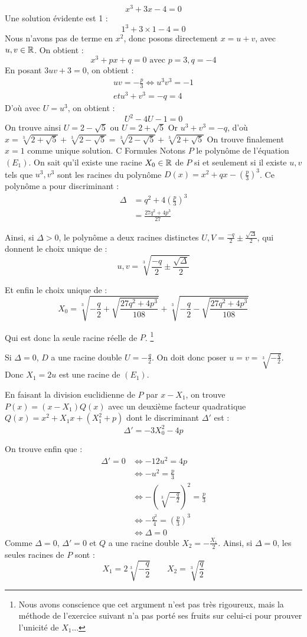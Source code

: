 \documentclass[]{../templates/homework}
\begin{document}
	$$ x^3 + 3x - 4 = 0$$
	\question Une solution évidente est 1 : $$1^3 + 3\times1 - 4 = 0$$
	\question Nous n'avons pas de terme en $x^2$, donc posons directement $x = u+v$, avec $u, v \in \mathbb R$.
	On obtient : $$x^3 + px + q = 0 \text{ avec } p=3, q=-4$$
	En posant $3uv + 3 = 0$, on obtient : 
\begin{align*}
 uv = -\frac{p}{3} \iff u^3v^3 = -1 \\
et u^3 + v^3 = -q = 4
\end{align*}
	D'où avec $U = u^3$, on obtient : $$U^2 -4U -1 =0$$
	On trouve ainsi $U = 2 - \sqrt{5}$ ou $U = 2 + \sqrt{5}$
	Or $u^3 + v^3 = -q$, d'où $x = \sqrt[3]{2+\sqrt{5}} + \sqrt[3]{2-\sqrt{5}} = \sqrt[3]{2-\sqrt{5}} + \sqrt[3]{2+\sqrt{5}}$
On trouve finalement $x=1$ comme unique solution.
	\partie C {Formules}
	 Notons $P$ le polynôme de l'équation $(E_1)$. On sait qu'il existe une racine $X_0 \in \mathbb R$ de $P$ si et seulement si il existe $u,v$ tels que $u^3,v^3$ sont les racines du polynôme $D(x) = x^2 + qx - \left(\frac p 3\right)^3$.
	Ce polynôme a pour discriminant :
	\begin{align*}
		\Delta &= q^2 + 4\left(\frac p 3\right)^3 \\
		&=  \frac {27q^2 + 4p^3}{27}
	\end{align*}
	
	
	Ainsi, si $\Delta > 0$, le polynôme a deux racines distinctes $U,V = \frac {-q}{2} \pm \frac {\sqrt \Delta} {2}$, qui donnent le choix unique de :
	$$u,v = \sqrt[3]{\frac {-q}{2} \pm \frac {\sqrt \Delta} {2}}$$
	
	Et enfin le choix unique de :
	$$X_0 = \sqrt[3]{-\frac {q}{2} + \sqrt {\frac {27q^2 + 4p^3}{108}} } + \sqrt[3]{-\frac {q}{2} - \sqrt {\frac {27q^2 + 4p^3}{108}} }$$
	
	Qui est donc la seule racine réelle de $P$. \footnote{Nous avons conscience que cet argument n'est pas très rigoureux, mais la méthode de l'exercice suivant n'a pas porté ses fruits sur celui-ci pour prouver l'unicité de $X_1$...}
	
	\subproblem Si $\Delta = 0$, $D$ a une racine double $U = -\frac q {2}$. On doit donc poser $u = v = \sqrt[3]{-\frac q 2}$. Donc $X_1 = 2u$ est une racine de $(E_1)$.
	
	
	En faisant la division euclidienne de $P$ par $x-X_1$, on trouve $P(x) = (x-X_1)Q(x)$ avec un deuxième facteur quadratique $Q(x) = x^2 + X_1x + (X_1^2 + p)$ dont le discriminant $\Delta'$ est :
	$$\Delta' = -3X_0^2 - 4p$$
	
	On trouve enfin que :
	\begin{align*}
		\Delta' = 0 &\iff -12u^2 = 4p \\
		&\iff -u^2 = \frac p 3\\
		&\iff -(\sqrt[3]{-\frac q 2})^2 = \frac p3\\
		&\iff -\frac {q^2} 4 = (\frac p 3)^3\\
		&\iff \Delta = 0
	\end{align*}
	Comme $\Delta = 0$, $\Delta' = 0$ et $Q$ a une racine double $X_2 = -\frac {X_1} 2$.
	Ainsi, si $\Delta = 0$, les seules racines de $P$ sont :
	\begin{equation*}
		X_1 = 2\sqrt[3]{-\frac q 2} \qquad X_2 = \sqrt[3]{\frac q 2}
	\end{equation*}
\end{document}
